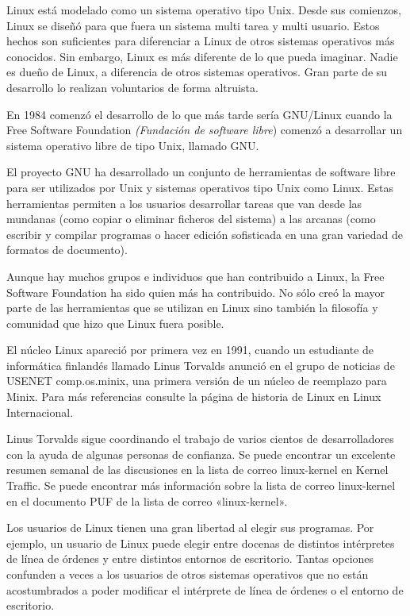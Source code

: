 \documentclass[12pt, twoside]{report}
\begin{document}
Linux está modelado como un sistema operativo tipo Unix. Desde sus comienzos, Linux se diseñó para que fuera un sistema multi tarea y multi usuario. Estos hechos son suficientes para diferenciar a Linux de otros sistemas operativos más conocidos. Sin embargo, Linux es más diferente de lo que pueda imaginar. Nadie es dueño de Linux, a diferencia de otros sistemas operativos. Gran parte de su desarrollo lo realizan voluntarios de forma altruista.

En 1984 comenzó el desarrollo de lo que más tarde sería GNU/Linux cuando la Free Software Foundation \textit{(Fundación de software libre}) comenzó a desarrollar un sistema operativo libre de tipo Unix, llamado GNU.

El proyecto GNU ha desarrollado un conjunto de herramientas de software libre para ser utilizados por Unix y sistemas operativos tipo Unix como Linux. Estas herramientas permiten a los usuarios desarrollar tareas que van desde las mundanas (como copiar o eliminar ficheros del sistema) a las arcanas (como escribir y compilar programas o hacer edición sofisticada en una gran variedad de formatos de documento).

Aunque hay muchos grupos e individuos que han contribuido a Linux, la Free Software Foundation ha sido quien más ha contribuido. No sólo creó la mayor parte de las herramientas que se utilizan en Linux sino también la filosofía y comunidad que hizo que Linux fuera posible.

El núcleo Linux apareció por primera vez en 1991, cuando un estudiante de informática finlandés llamado Linus Torvalds anunció en el grupo de noticias de USENET comp.os.minix, una primera versión de un núcleo de reemplazo para Minix. Para más referencias consulte la página de historia de Linux en Linux Internacional.

Linus Torvalds sigue coordinando el trabajo de varios cientos de desarrolladores con la ayuda de algunas personas de confianza. Se puede encontrar un excelente resumen semanal de las discusiones en la lista de correo linux-kernel en Kernel Traffic. Se puede encontrar más información sobre la lista de correo linux-kernel en el documento PUF de la lista de correo «linux-kernel».

Los usuarios de Linux tienen una gran libertad al elegir sus programas. Por ejemplo, un usuario de Linux puede elegir entre docenas de distintos intérpretes de línea de órdenes y entre distintos entornos de escritorio. Tantas opciones confunden a veces a los usuarios de otros sistemas operativos que no están acostumbrados a poder modificar el intérprete de línea de órdenes o el entorno de escritorio.
\end{document}
